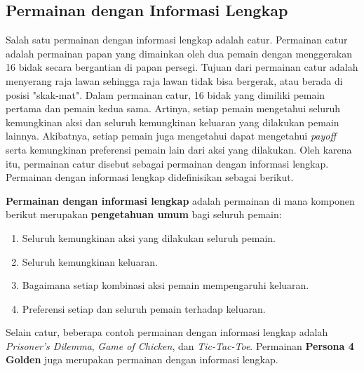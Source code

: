 \subsection{Permainan dengan Informasi Lengkap}
Salah satu permainan dengan informasi lengkap adalah catur. Permainan catur adalah permainan papan yang dimainkan oleh dua pemain dengan menggerakan 16 bidak secara bergantian di papan persegi. Tujuan dari permainan catur adalah menyerang raja lawan sehingga raja lawan tidak bisa bergerak, atau berada di posisi "skak-mat". Dalam permainan catur, 16 bidak yang dimiliki pemain pertama dan pemain kedua sama. Artinya, setiap pemain mengetahui seluruh kemungkinan aksi dan seluruh kemungkinan keluaran yang dilakukan pemain lainnya. Akibatnya, setiap pemain juga mengetahui dapat mengetahui \textit{payoff} serta kemungkinan preferensi pemain lain dari aksi yang dilakukan. Oleh karena itu, permainan catur disebut sebagai permainan dengan informasi lengkap. Permainan dengan informasi lengkap didefinisikan sebagai berikut.
\begin{definisi}
    \textbf{Permainan dengan informasi lengkap} adalah permainan di mana komponen berikut merupakan \textbf{pengetahuan umum} bagi seluruh pemain:
    \begin{enumerate}
        \item Seluruh kemungkinan aksi yang dilakukan seluruh pemain.
        \item Seluruh kemungkinan keluaran.
        \item Bagaimana setiap kombinasi aksi pemain mempengaruhi keluaran.
        \item Preferensi setiap dan seluruh pemain terhadap keluaran.
    \end{enumerate}
\end{definisi}

Selain catur, beberapa contoh permainan dengan informasi lengkap adalah \textit{Prisoner's Dilemma}, \textit{Game of Chicken}, dan \textit{Tic-Tac-Toe}. Permainan \textbf{Persona 4 Golden} juga merupakan permainan dengan informasi lengkap.

